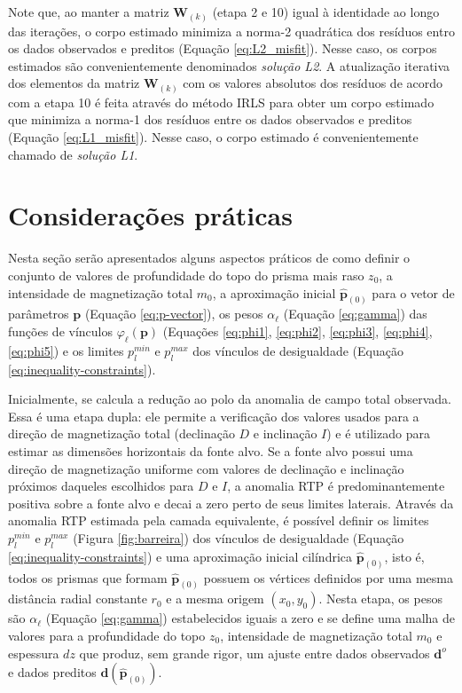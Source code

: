 Note que, ao manter a matriz $\mathbf{W}_{(k)}$ (etapa 2 e 10) igual à identidade ao longo das iterações, o corpo estimado minimiza a norma-2 quadrática dos resíduos entro os dados observados e preditos (Equação \ref{eq:L2_misfit}). 
Nesse caso, os corpos estimados são convenientemente denominados \textit{solução L2}. 
A atualização iterativa dos elementos da matriz $\mathbf{W}_{(k)}$ com os valores absolutos dos resíduos de acordo com a etapa 10 é feita através do método IRLS \citep[][p. 46]{scales_gersztenkorn1988, aster_etal2019} para obter um corpo estimado que minimiza a norma-1 dos resíduos entre os dados observados e preditos 
(Equação \ref{eq:L1_misfit}). Nesse caso, o corpo estimado é convenientemente chamado de \textit{solução L1}.

\section{Considerações práticas}

Nesta seção serão apresentados alguns aspectos práticos de como definir o conjunto de valores de profundidade do topo do prisma mais raso $z_{0}$, a intensidade de magnetização total $m_{0}$, a aproximação inicial
$\hat{\mathbf{p}}_{(0)}$ para o vetor de parâmetros $\mathbf{p}$ (Equação \ref{eq:p-vector}),
os pesos $\alpha_{\ell}$ (Equação \ref{eq:gamma}) das funções de vínculos 
$\varphi_{\ell}(\mathbf{p})$ 
(Equações \ref{eq:phi1}, \ref{eq:phi2}, \ref{eq:phi3}, \ref{eq:phi4}, \ref{eq:phi5}) e os limites $p_{l}^{min}$ e $p_{l}^{max}$ dos vínculos de desigualdade (Equação 
\ref{eq:inequality-constraints}).

Inicialmente, se calcula a redução ao polo da anomalia de campo total observada. Essa é uma etapa dupla: ele permite a verificação dos valores usados para a direção de magnetização total (declinação $D$ e inclinação $I$) e é utilizado para estimar as dimensões horizontais da fonte alvo.
Se a fonte alvo possui uma direção de magnetização uniforme com valores de declinação e inclinação próximos daqueles escolhidos para $D$ e $I$, a anomalia RTP é predominantemente positiva sobre a fonte alvo e decai a zero perto de seus limites laterais.
Através da anomalia RTP estimada pela camada equivalente, é possível definir os limites $p_{l}^{min}$ e $p_{l}^{max}$ (Figura \ref{fig:barreira}) dos vínculos de desigualdade (Equação \ref{eq:inequality-constraints}) e uma aproximação inicial cilíndrica $\hat{\mathbf{p}}_{(0)}$, isto é, todos os prismas que formam $\hat{\mathbf{p}}_{(0)}$ possuem os vértices definidos por uma mesma distância radial constante $r_{0}$ e a mesma origem $(x_{0}, y_{0})$.
Nesta etapa, os pesos são $\alpha_{\ell}$ (Equação \ref{eq:gamma}) estabelecidos iguais a zero e se define uma malha de valores para a profundidade do topo $z_{0}$, intensidade de magnetização total $m_{0}$ e espessura $dz$ que produz, sem grande rigor, um ajuste entre dados observados $\mathbf{d}^{o}$ e dados preditos $\mathbf{d}(\hat{\mathbf{p}}_{(0)})$.

